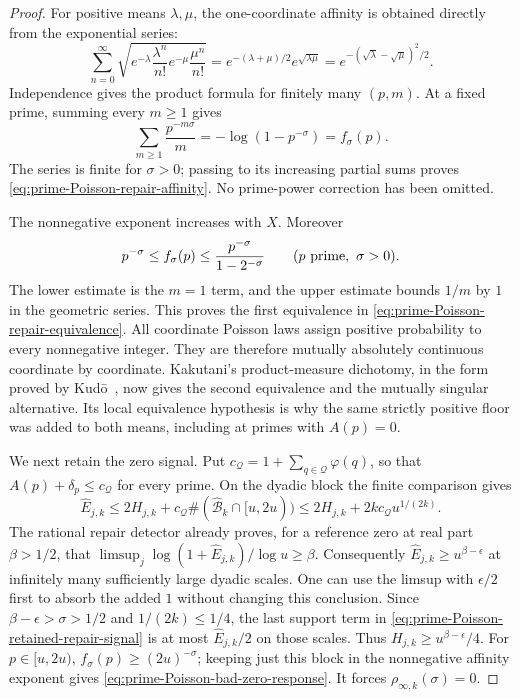 \documentclass[11pt]{article}
\theoremstyle{definition}
\begin{document}
\begin{proof}
For positive means $\lambda,\mu$, the one-coordinate affinity
is obtained directly from the exponential series:
\[
 \sum_{n=0}^\infty
 \sqrt{e^{-\lambda}\frac{\lambda^n}{n!}
       e^{-\mu}\frac{\mu^n}{n!}}
   =e^{-(\lambda+\mu)/2}e^{\sqrt{\lambda\mu}}
   =e^{-(\sqrt\lambda-\sqrt\mu)^2/2}.
\]
Independence gives the product formula for finitely many
$(p,m)$. At a fixed prime, summing every $m\ge1$ gives
\[
 \sum_{m\ge1}\frac{p^{-m\sigma}}m
       =-\log(1-p^{-\sigma})=f_\sigma(p).
\]
The series is finite for $\sigma>0$; passing to its increasing
partial sums proves \eqref{eq:prime-Poisson-repair-affinity}.
No prime-power correction has been omitted.

The nonnegative exponent increases with $X$. Moreover
\begin{equation}
 p^{-\sigma}\le f_\sigma(p)
       \le\frac{p^{-\sigma}}{1-2^{-\sigma}}
                    \qquad(p\ {\rm prime},\ \sigma>0).
 \label{eq:prime-Poisson-primepower-comparison}
\end{equation}
The lower estimate is the $m=1$ term, and the upper estimate
bounds $1/m$ by $1$ in the geometric series.
This proves the first equivalence in
\eqref{eq:prime-Poisson-repair-equivalence}.
All coordinate Poisson laws assign positive probability
to every nonnegative integer. They are therefore mutually
absolutely continuous coordinate by coordinate.
Kakutani's product-measure dichotomy, in the form proved
by Kud\=o~\cite{KudoKakutani}, now gives the second equivalence
and the mutually singular alternative. Its local equivalence
hypothesis is why the same strictly positive floor was added
to both means, including at primes with $A(p)=0$.

We next retain the zero signal. Put
$c_{\mathcal Q}=1+\sum_{q\in\mathcal Q}\varphi(q)$, so that
$A(p)+\delta_p\le c_{\mathcal Q}$ for every prime.
On the dyadic block the finite comparison gives
\begin{equation}
 \widehat E_{j,k}
   \le2H_{j,k}
       +c_{\mathcal Q}
            \#(\widehat{\mathcal B}_k\cap[u,2u))
   \le2H_{j,k}
       +2k c_{\mathcal Q}u^{1/(2k)}.
 \label{eq:prime-Poisson-retained-repair-signal}
\end{equation}
The rational repair detector already proves, for a reference
zero at real part $\beta>1/2$, that
$\limsup_j\log(1+\widehat E_{j,k})/\log u\ge\beta$.
Consequently $\widehat E_{j,k}\ge u^{\beta-\epsilon}$
at infinitely many sufficiently large dyadic scales.
One can use the limsup with $\epsilon/2$ first to absorb
the added $1$ without changing this conclusion.
Since $\beta-\epsilon>\sigma>1/2$ and $1/(2k)\le1/4$,
the last support term in
\eqref{eq:prime-Poisson-retained-repair-signal} is at most
$\widehat E_{j,k}/2$ on those scales. Thus
$H_{j,k}\ge u^{\beta-\epsilon}/4$.
For $p\in[u,2u)$,
$f_\sigma(p)\ge(2u)^{-\sigma}$; keeping just this block
in the nonnegative affinity exponent gives
\eqref{eq:prime-Poisson-bad-zero-response}.
It forces $\rho_{\infty,k}(\sigma)=0$.


\end{proof}
\end{document}
